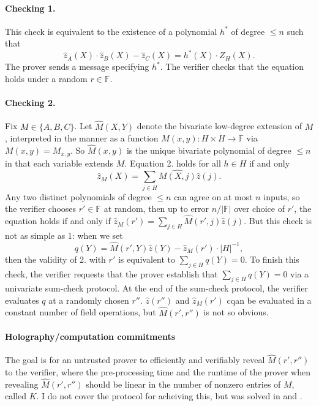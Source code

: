 \documentclass[11pt]{article}
\begin{document}
\paragraph{Checking 1.} This check is equivalent to the existence of a polynomial $h^*$ of degree $\leq n$ such that
\[ \hat{z}_A(X) \cdot \hat{z}_B(X) - \hat{z}_C(X) = h^*(X) \cdot Z_H(X). \]
The prover sends a message specifying $h^*$. The verifier checks that the equation holds under a random $r \in \mathbb{F}$.

\paragraph{Checking 2.} Fix $M \in \{A, B, C\}$. Let $\hat{M}(X, Y)$ denote the bivariate low-degree extension of $M$, interpreted in the manner as a function $M(x, y): H \times H \rightarrow \mathbb{F}$ via $M(x, y) = M_{x,y}$. So $\hat{M}(x, y)$ is the unique bivariate polynomial of degree $\leq n$ in that each variable extends $M$. Equation 2. holds for all $h \in H$ if and only
\[ \hat{z}_M(X) = \sum_{j \in H} \hat{M(X, j)} \hat{z}(j). \]
Any two distinct polynomials of degree $\leq n$ can agree on at most $n$ inputs, so the verifier chooses $r' \in \mathbb{F}$ at random, then up to error $n/|\mathbb{F}|$ over choice of $r'$, the equation holds if and only if $\hat{z}_M(r') = \sum_{j \in H} \hat{M}(r', j) \hat{z}(j)$. But this check is not as simple as 1: when we set
\[ q(Y) = \hat{M}(r', Y) \hat{z}(Y) - \hat{z}_M(r') \cdot |H|^{-1}, \]
then the validity of 2. with $r'$ is equivalent to $\sum_{j \in H} q(Y) = 0$. To finish this check, the verifier requests that the prover establish that $\sum_{j \in H} q(Y) = 0$ via a univariate sum-check protocol. At the end of the sum-check protocol, the verifier evaluates $q$ at a randomly chosen $r''$. $\hat{z}(r'')$ and $\hat{z}_M(r')$ cqan be evaluated in a constant number of field operations, but $\hat{M}(r', r'')$ is not so obvious.

\paragraph{Holography/computation commitments} The goal is for an untrusted prover to efficiently and verifiably reveal $\hat{M}(r', r'')$ to the verifier, where the pre-processing time and the runtime of the prover when revealing $\hat{M}(r', r'')$ should be linear in the number of nonzero entries of $M$, called $K$. I do not cover the protocol for acheiving this, but was solved in \cite{chm20} and \cite{cos20}.



\end{document}
